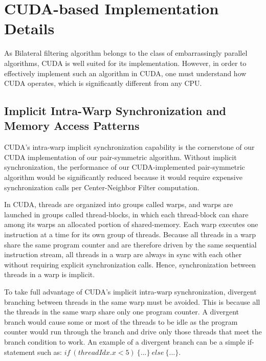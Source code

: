 \documentclass{IEEEtran}
\begin{document}
\section{CUDA-based Implementation Details}
\label{sec:GPUoptimizations} 
As Bilateral filtering algorithm belongs to the class of embarrassingly parallel algorithms, CUDA is well suited for its implementation. However,
in order to effectively implement such an algorithm in CUDA, one must understand how CUDA operates, which is significantly different from any CPU.

\subsection{Implicit Intra-Warp Synchronization and Memory Access Patterns}

CUDA's intra-warp implicit synchronization capability is the cornerstone of our CUDA implementation of our pair-symmetric algorithm. Without implicit synchronization, the performance of our CUDA-implemented pair-symmetric algorithm would be significantly reduced because it would require expensive synchronization calls per Center-Neighbor Filter computation.

In CUDA, threads are organized into groups called warps, and warps are launched in groups called thread-blocks, in which each thread-block can share among its warps an allocated portion of shared-memory. Each warp executes one instruction at a time for its own group of threads. Because all threads in a warp share the same program counter and are therefore driven by the same sequential instruction stream, all threads in a warp are always in sync with each other without requiring explicit synchronization calls. Hence, synchronization between threads in a warp is implicit.

To take full advantage of CUDA's implicit intra-warp synchronization, divergent branching between threads in the same warp must be avoided. This is because all the threads in the same warp share only one program counter. A divergent branch would cause some or most of the threads to be idle as the program counter would run through the branch and drive only those threads that meet the branch condition to work. An example of a divergent branch can be a simple if-statement such as: $if~(threadIdx.x < 5)~\{...\}~else~\{...\}$.
\end{document}
